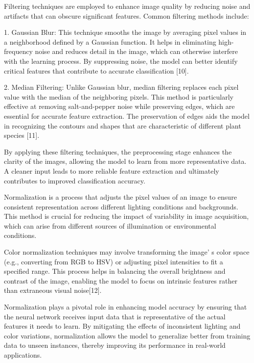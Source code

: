 \begin{multicols}{2}
Filtering techniques are employed to enhance image quality by reducing
noise and artifacts that can obscure significant features. Common
filtering methods include:

1. Gaussian Blur: This technique smooths the image by averaging pixel
values in a neighborhood defined by a Gaussian function. It helps in
eliminating high-frequency noise and reduces detail in the image,
which can otherwise interfere with the learning process. By
suppressing noise, the model can better identify critical features
that contribute to accurate classification {[}10{]}.

2. Median Filtering: Unlike Gaussian blur, median filtering replaces each
pixel value with the median of the neighboring pixels. This method is
particularly effective at removing salt-and-pepper noise while
preserving edges, which are essential for accurate feature extraction.
The preservation of edges aids the model in recognizing the contours
and shapes that are characteristic of different plant species
{[}11{]}.

By applying these filtering techniques, the preprocessing stage enhances
the clarity of the images, allowing the model to learn from more
representative data. A cleaner input leads to more reliable feature
extraction and ultimately contributes to improved classification
accuracy.

Normalization is a process that adjusts the pixel values of an image to
ensure consistent representation across different lighting conditions
and backgrounds. This method is crucial for reducing the impact of
variability in image acquisition, which can arise from different sources
of illumination or environmental conditions.

Color normalization techniques may involve transforming the
image' s color space (e.g., converting from RGB to HSV)
or adjusting pixel intensities to fit a specified range. This process
helps in balancing the overall brightness and contrast of the image,
enabling the model to focus on intrinsic features rather than extraneous
visual noise{[}12{]}.

Normalization plays a pivotal role in enhancing model accuracy by
ensuring that the neural network receives input data that is
representative of the actual features it needs to learn. By mitigating
the effects of inconsistent lighting and color variations, normalization
allows the model to generalize better from training data to unseen
instances, thereby improving its performance in real-world applications.


\end{multicols}
